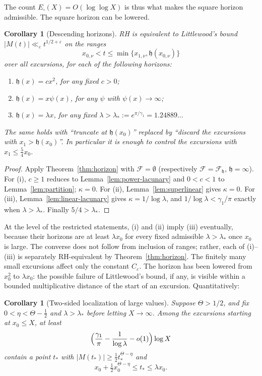 \documentclass[11pt]{amsart}
\numberwithin{equation}{section}
\theoremstyle{plain}
\newtheorem{corollary}[theorem]{Corollary}
\theoremstyle{definition}
\theoremstyle{remark}
\newcommand{\eps}{\varepsilon}
\newcommand{\F}{\mathcal{F}}
\begin{document}
The count $E_\square(X)=O(\log\log X)$ is thus what makes the square
horizon admissible. The square horizon can be lowered.

\begin{corollary}[Descending horizons]
\label{cor:descending}
RH is equivalent to Littlewood's bound
$|M(t)|\ll_\eps t^{1/2+\eps}$ on the ranges
\[
x_{0,\nu}<t\le\min\{x_{1,\nu},\mathfrak h(x_{0,\nu})\}
\]
over all excursions, for each of the following horizons:
\begin{enumerate}[label=\textup{(\roman*)}]
\item $\mathfrak h(x)=cx^2$, for any fixed $c>0$;
\item $\mathfrak h(x)=x\psi(x)$, for any $\psi$ with $\psi(x)\to\infty$;
\item $\mathfrak h(x)=\lambda x$, for any fixed $\lambda>\lambda_*:=e^{\pi/\gamma_1}=1.24889\ldots$
\end{enumerate}
The same holds with ``truncate at $\mathfrak h(x_0)$'' replaced by ``discard the
excursions with $x_1>\mathfrak h(x_0)$''. In particular it is enough to control the
excursions with $x_1\le\frac54x_0$.
\end{corollary}

\begin{proof}
Apply Theorem~\ref{thm:horizon} with $\F=\emptyset$ (respectively
$\F=\F_{\mathfrak h}$, $\mathfrak h=\infty$). For (i), $c\ge1$ reduces to
Lemma~\ref{lem:power-lacunary} and $0<c<1$ to Lemma~\ref{lem:partition};
$\kappa=0$. For (ii), Lemma~\ref{lem:superlinear} gives $\kappa=0$. For
(iii), Lemma~\ref{lem:linear-lacunary} gives $\kappa=1/\log\lambda$, and
$1/\log\lambda<\gamma_1/\pi$ exactly when $\lambda>\lambda_*$. Finally
$5/4>\lambda_*$.
\end{proof}

At the level of the restricted statements, (i) and (ii) imply (iii)
eventually, because their horizons are at least $\lambda x_0$ for every
fixed admissible $\lambda>\lambda_*$ once $x_0$ is large.  The converse
does not follow from inclusion of ranges; rather, each of (i)--(iii) is
separately RH-equivalent by Theorem~\ref{thm:horizon}.  The finitely many
small excursions affect only the constant $C_\eps$. The horizon has
been lowered from $x_0^2$ to $\lambda x_0$: the possible failure of
Littlewood's bound, if any, is visible within a bounded multiplicative
distance of the start of an excursion. Quantitatively:

\begin{corollary}[Two-sided localization of large values]
\label{cor:two-sided}
Suppose $\Theta>1/2$, and fix $0<\eta<\Theta-\frac12$ and
$\lambda>\lambda_*$ before letting $X\to\infty$.
Among the excursions starting at $x_0\le X$, at least
\[
\Bigl(\frac{\gamma_1}{\pi}-\frac1{\log\lambda}-o(1)\Bigr)\log X
\]
contain a point $t_*$ with $|M(t_*)|\ge\frac12t_*^{\Theta-\eta}$ and
\[
x_0+\tfrac12x_0^{\Theta-\eta}\le t_*\le\lambda x_0 .
\]
\end{corollary}
\end{document}
